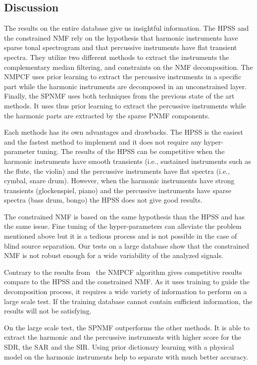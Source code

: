 \subsection{Discussion}
\label{discu}

The results on the entire database give us insightful information.
The HPSS and the constrained NMF rely on the hypothesis that harmonic instruments have sparse tonal spectrogram and that percussive instruments have flat transient spectra. They utilize two different methods to extract the instruments the complementary median filtering, and constraints on the NMF decomposition.
The NMPCF uses prior learning to extract the percussive instruments in a specific part while the harmonic instruments are decomposed in an unconstrained layer. 
Finally, the SPNMF uses both techniques from the previous state of the art methods. It uses thus prior learning to extract the percussive instruments while the harmonic parts are extracted by the sparse PNMF components.



Each methods has its own advantages and  drawbacks. The HPSS is the easiest and the fastest method to implement and it does not require any hyper-parameter tuning. The results of the HPSS can be competitive when the harmonic instruments have smooth transients (i.e., sustained instruments such as the flute, the violin) and the percussive instruments have flat spectra (i.e., cymbal, snare drum). However, when the harmonic instruments have strong transients (glockenspiel, piano) and the percussive instruments have sparse spectra (bass drum, bongo) the HPSS does not give good results. 

The constrained NMF is based on the same hypothesis than the HPSS and has the same issue. Fine tuning of the hyper-parameters can alleviate the problem mentioned above but it is a tedious process and is not possible in the case of blind source separation. Our tests on a large database show that the constrained NMF is not robust enough for a wide variability of the analyzed signals.

Contrary to the results from~\cite{canadas2014percussive} the NMPCF algorithm gives competitive results compare to the HPSS and the constrained NMF. As it uses training to guide the decomposition process, it requires a wide variety of information to perform on a large scale test. If the training database cannot contain sufficient information, the results will not be satisfying. 

On the large scale test, the SPNMF outperforms the other methods. It is able to extract the harmonic and the percussive instruments with higher score for the SDR, the SAR and the SIR. Using prior dictionary learning with a physical model on the harmonic instruments help to separate with much better accuracy.

